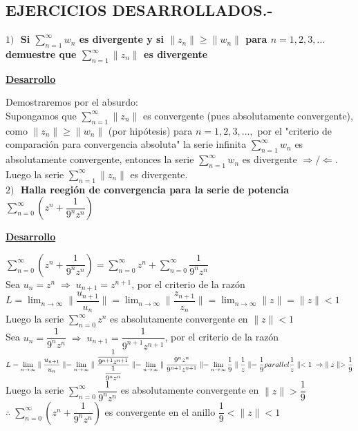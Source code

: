 \documentclass[10pt,a4paper]{article}
\begin{document}
\subsection{EJERCICIOS DESARROLLADOS.-}
\textbf{$1) \; $ Si $\displaystyle{\sum_{ n = 1}^{  \infty} w_n}$ es divergente y si $\parallel z_n  \parallel \geq \parallel w_n  \parallel $ para $n = 1,2,3,...$ demuestre que $\displaystyle{\sum_{ n = 1}^{ \infty} \parallel z_n \parallel }$ es divergente}
\begin{center}
\textbf{\underline{Desarrollo}}
\end{center}
Demostraremos por el absurdo: \\
Supongamos que $\displaystyle{\sum_{ n = 1}^{ \infty} \parallel z_n \parallel }$ es convergente (pues absolutamente convergente), como $\parallel  z_n\parallel \geq \parallel w_n \parallel$ (por hipótesis) para $n = 1,2,3,...,$ por el "criterio de comparación para convergencia absoluta" la serie infinita $\displaystyle{\sum_{n = 1}^{\infty} w_n}$  es absolutamente convergente, entonces la serie $\displaystyle{\sum_{n = 1}^{\infty} w_n}$ es divergente $\displaystyle{\Rightarrow / \Leftarrow}$. Luego la serie $\displaystyle{\sum_{n = 1}^{\infty} \parallel z_n \parallel}$ es divergente.\\
\textbf{$2) \; $ Halla reegión de convergencia para la serie de potencia $\displaystyle{\sum_{ n = 0}^{\infty} (z^n + \dfrac{1}{9^n z^n})}$}
\begin{center}
\textbf{\underline{Desarrollo}}
\end{center}
$\displaystyle{\sum_{ n = 0}^{\infty} (z^n + \dfrac{1}{9^n z^n}) = \sum_{ n = 0}^{\infty}z^n + \sum_{n = 0}^{\infty} \dfrac{1}{9^n z^n}}$\\
Sea $u_n = z^n \; \Rightarrow \; u_{n+1} = z^{n+1}$, por el criterio de la razón\\
$\displaystyle{L = \lim_{n \to \infty} \parallel   \dfrac{u_{n+1}}{u_n} \parallel = \lim_{n \to \infty} \parallel   \dfrac{z_{n+1}}{z_n} \parallel = \lim_{n \to \infty} \parallel   z \parallel = \parallel z \parallel < 1} $\\
Luego la serie $\displaystyle{\sum_{ n = 0}^{\infty} z^n}$ es absolutamente convergente en $\parallel z \parallel < 1$\\
Sea $u_n = \dfrac{1}{9^n z^n} \; \Rightarrow \; u_{n+1} = \dfrac{1}{9^{n+1} z^{n+1}}$, por el criterio de la razón\\
$\displaystyle{L = \lim_{n \to \infty} \parallel   \dfrac{u_{n+1}}{u_n} \parallel = \lim_{n \to \infty} \parallel   \dfrac{\dfrac{1}{9^{n+1} z^{n+1}}}{\dfrac{1}{9^n z^n}} \parallel = \lim_{n \to \infty} \parallel   \dfrac{9^n z^n}{9^{n+1} z^{n+1}} \parallel = \lim_{n \to \infty} \dfrac{1}{9} \parallel  \dfrac{1}{z}\parallel = \dfrac{1}{9} \\parallel \dfrac{1}{z} \parallel < 1 \; \Rightarrow \; \parallel z \parallel > \dfrac{1}{9} }$\\
Luego la serie $\displaystyle{\sum_{n = 0}^{\infty} \dfrac{1}{9^n z^n}}$ es absolutamente convergente en $\parallel z \parallel > \dfrac{1}{9}$ \\
$\displaystyle{\therefore \; \sum_{n = 0}^{\infty} (z^n + \dfrac{1}{9^n z^n})} $ es convergente en el anillo $\dfrac{1}{9} < \parallel z \parallel < 1$
 
\end{document}
